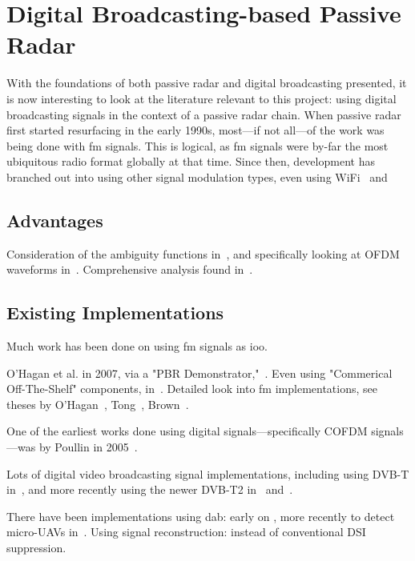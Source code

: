 \documentclass[class=report,11pt,crop=false]{standalone}
\begin{document}
\section{Digital Broadcasting-based Passive Radar}
With the foundations of both passive radar and digital broadcasting presented, it is now interesting to look at the literature relevant to this project: using digital broadcasting signals in the context of a passive radar chain. When passive radar first started resurfacing in the early 1990s, most---if not all---of the work was being done with \gls{fm} signals. This is logical, as \gls{fm} signals were by-far the most ubiquitous radio format globally at that time. Since then, development has branched out into using other signal modulation types, even using WiFi~\cite{Guo2008} and 

\subsection{Advantages}

Consideration of the ambiguity functions in~\cite{Griffithsa}, and specifically looking at OFDM waveforms in~\cite{Searle2014}. Comprehensive analysis found in~\cite{Malanowski2019}.

\subsection{Existing Implementations}
Much work has been done on using \gls{fm} signals as \gls{ioo}.

O'Hagan et al. in 2007, via a "PBR Demonstrator,"~\cite{OHagan2007}. Even using "Commerical Off-The-Shelf" components, in~\cite{Tong2015}. Detailed look into \gls{fm} implementations, see theses by O'Hagan~\cite{o2009passive}, Tong~\cite{tong2014}, Brown~\cite{brown2013fm}.

One of the earliest works done using digital signals---specifically COFDM signals---was by Poullin in 2005~\cite{Poullin2005}.

Lots of digital video broadcasting signal implementations, including using DVB-T in~\cite{radmard2012feasibility, palmer2011overview,Peto2014}, and more recently using the newer DVB-T2 in~\cite{OHagan2018} and~\cite{Low2019}.

There have been implementations using \gls{dab}: early on \cite{Yardley2007,Coleman2008}, more recently to detect micro-UAVs in~\cite{Schupbach2017}.
Using signal reconstruction: \cite{ohagan2010dab} instead of conventional DSI suppression.
\end{document}
